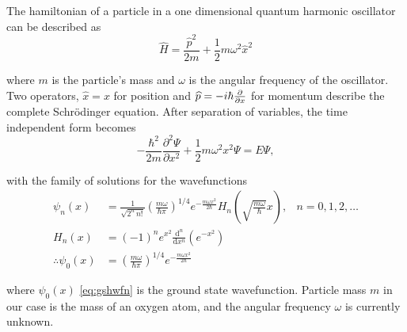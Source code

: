 The hamiltonian of a particle in a one dimensional quantum harmonic oscillator can be described as
\begin{equation}
\widehat{H} = \frac{\widehat{p}^2}{2m}+\frac{1}{2}m\omega^2\widehat{x}^2\label{eq:hamho}
\end{equation}

where $m$ is the particle's mass and $ω$ is the angular frequency of the oscillator.
Two operators, $\widehat{x} = x$ for position and $\cramped{\widehat{p} = -i\hbar \frac{\partial}{\partial x}}$ for momentum describe the complete Schr\"{o}dinger equation.
After separation of variables, the time independent form becomes
\begin{equation}
-\frac{\hbar^2}{2m}\frac{\partial^2 \Psi}{\partial x^2}+\frac{1}{2}m\omega^2x^2 \Psi = E\Psi,
\label{eq:hamti}
\end{equation}

with the family of solutions for the wavefunctions
\begin{align}\psi_n(x) &= \frac{1}{\sqrt{2^n\,n!}}\left(\frac{m\omega}{\hbar\pi}\right)^{1/4}e^{
- \frac{m\omega x^2}{2 \hbar}} H_n\left(\sqrt{\frac{m\omega}{\hbar}} x \right), &n = 0,1,2,\ldots \\
H_n(x) &= (-1)^n e^{x^2}\frac{\mathrm{d}^n}{\mathrm{d}x^n}\left(e^{-x^2}\right) \\
\therefore \psi_0(x) &= \left(\frac{m\omega}{\hbar\pi}\right)^{1/4}e^{
- \frac{m\omega x^2}{2 \hbar}} \label{eq:gshwfn}
\end{align}

where $\psi_0(x)$ \cref{eq:gshwfn} is the ground state wavefunction. Particle mass $m$ in our case is the mass of an oxygen atom, and the angular frequency $\omega$ is currently unknown.

